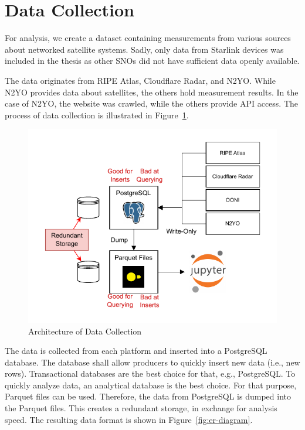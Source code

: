 \section{Data Collection} \label{sec:data-collection}

For analysis, we create a dataset containing measurements from various sources
about networked satellite systems. Sadly, only data from Starlink devices was
included in the thesis as other \ac{SNO}s did not have sufficient data openly
available.

The data originates from RIPE Atlas, Cloudflare Radar, and N2YO. While
N2YO provides data about satellites, the others hold measurement results. In
the case of N2YO, the website was crawled, while the others provide API
access. The process of data collection is illustrated in
Figure~\ref{fig:data-collection-process}.

\begin{figure}[h]
	\centering
	\includegraphics[width=\textwidth]{./chapters/3-methodology/img/architecture.drawio.pdf}
	\caption{Architecture of Data Collection}
	\label{fig:data-collection-process}
\end{figure}

The data is collected from each platform and inserted into a PostgreSQL
database. The database shall allow producers to quickly insert new data (i.e.,
new rows). Transactional databases are the best choice for that, e.g.,
PostgreSQL. To quickly analyze data, an analytical database is the best choice.
For that purpose, Parquet files can be used. Therefore, the data from
PostgreSQL is dumped into the Parquet files. This creates a redundant storage,
in exchange for analysis speed. The resulting data format is shown in
Figure~\ref{fig:er-diagram}.

